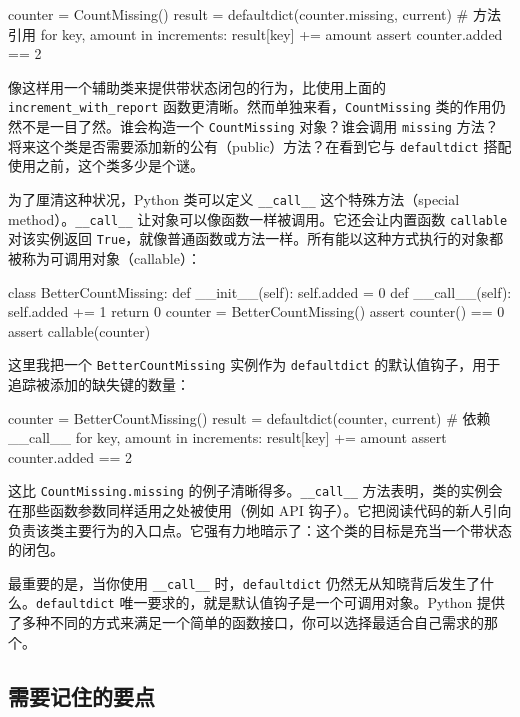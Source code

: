 \begin{codebox}[python]
counter = CountMissing()
result = defaultdict(counter.missing, current)  # 方法引用
for key, amount in increments:
    result[key] += amount
assert counter.added == 2
\end{codebox}

像这样用一个辅助类来提供带状态闭包的行为，比使用上面的 \texttt{increment\_with\_report} 函数更清晰。然而单独来看，\texttt{CountMissing} 类的作用仍然不是一目了然。谁会构造一个 \texttt{CountMissing} 对象？谁会调用 \texttt{missing} 方法？将来这个类是否需要添加新的公有（public）方法？在看到它与 \texttt{defaultdict} 搭配使用之前，这个类多少是个谜。

为了厘清这种状况，Python 类可以定义 \texttt{\_\_call\_\_} 这个特殊方法（special method）。\texttt{\_\_call\_\_} 让对象可以像函数一样被调用。它还会让内置函数 \texttt{callable} 对该实例返回 \texttt{True}，就像普通函数或方法一样。所有能以这种方式执行的对象都被称为可调用对象（callable）：

\begin{codebox}[python]
class BetterCountMissing:
    def __init__(self):
        self.added = 0
    def __call__(self):
        self.added += 1
        return 0
counter = BetterCountMissing()
assert counter() == 0
assert callable(counter)
\end{codebox}

这里我把一个 \texttt{BetterCountMissing} 实例作为 \texttt{defaultdict} 的默认值钩子，用于追踪被添加的缺失键的数量：

\begin{codebox}[python]
counter = BetterCountMissing()
result = defaultdict(counter, current)  # 依赖 __call__
for key, amount in increments:
    result[key] += amount
assert counter.added == 2
\end{codebox}

这比 \texttt{CountMissing.missing} 的例子清晰得多。\texttt{\_\_call\_\_} 方法表明，类的实例会在那些函数参数同样适用之处被使用（例如 API 钩子）。它把阅读代码的新人引向负责该类主要行为的入口点。它强有力地暗示了：这个类的目标是充当一个带状态的闭包。

最重要的是，当你使用 \texttt{\_\_call\_\_} 时，\texttt{defaultdict} 仍然无从知晓背后发生了什么。\texttt{defaultdict} 唯一要求的，就是默认值钩子是一个可调用对象。Python 提供了多种不同的方式来满足一个简单的函数接口，你可以选择最适合自己需求的那个。

\subsection{需要记住的要点}

